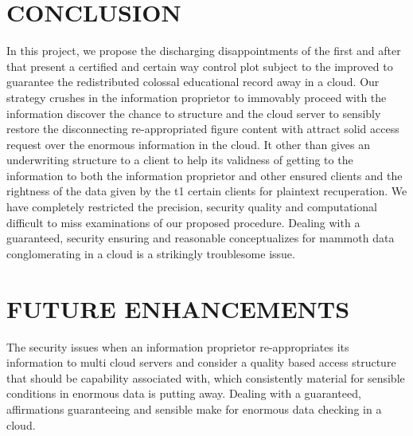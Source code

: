 \documentclass[BTech]{srmuthesis}
\begin{document}
\section{CONCLUSION}
In this project, we propose the discharging disappointments of the first and after that present a certified and certain way control plot subject to the improved to guarantee the redistributed colossal educational record away in a cloud. Our strategy crushes in the information proprietor to immovably proceed with the information discover the chance to structure and the cloud server to sensibly restore the disconnecting re-appropriated figure content with attract solid access request over the enormous information in the cloud. It other than gives an underwriting structure to a client to help its validness of getting to the information to both the information proprietor and other ensured clients and the rightness of the data given by the t1 certain clients for plaintext recuperation. We have completely restricted the precision, security quality and computational difficult to miss examinations of our proposed procedure. Dealing with a guaranteed, security ensuring and reasonable conceptualizes for mammoth data conglomerating in a cloud is a strikingly troublesome issue. 

\section{FUTURE ENHANCEMENTS}
The security issues when an information proprietor re-appropriates its information to multi cloud servers and consider a quality based access structure   that should be capability associated with, which consistently material for sensible conditions in enormous data is putting away. Dealing with a guaranteed, affirmations guaranteeing and sensible make for enormous data checking in a cloud.

\appendix
\end{document}
